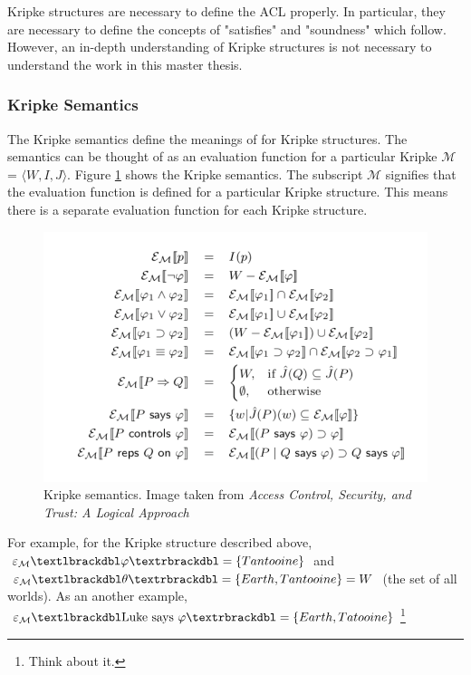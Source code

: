 \documentclass[../../main/main.tex]{subfiles}
\begin{document}
Kripke structures are necessary to define the ACL properly.  In particular, they are necessary to define the concepts of "satisfies" and "soundness" which follow.  However, an in-depth understanding of Kripke structures is not necessary to understand the work in this master thesis.  

\subsubsection{Kripke Semantics}\label{ssec:kripkesemantics}
The Kripke semantics define the meanings of  for Kripke structures.  The semantics can be thought of as an evaluation function for a particular Kripke $\mathcal{M}$ = $\langle \textit{W}, \textit{I}, \textit{J} \rangle $.  Figure \ref{kripkesemantics} shows the Kripke semantics.  The subscript $\mathcal{M}$ signifies that the evaluation function is defined for a particular Kripke structure.  This means there is a separate evaluation function for each Kripke structure.


\begin{figure}[h]
\centering
\includegraphics{../figures/kripkesemantics}
\caption{\label{kripkesemantics} Kripke semantics. Image taken from \textit{Access Control, Security, and Trust: A Logical Approach}\cite{ChinOlder}}
\end{figure}

For example, for the Kripke structure described above, $\varepsilon_{\mathcal{M}}\textlbrackdbl \varphi \textrbrackdbl  = \{Tantooine\}$ and $\varepsilon_{\mathcal{M}}\textlbrackdbl \theta \textrbrackdbl  = \{Earth, Tantooine\} = W$ (the set of all worlds).  As an another example, $\varepsilon_{\mathcal{M}}\textlbrackdbl \text{Luke says $\varphi$} \textrbrackdbl = \{Earth, Tatooine\}$\footnote{Think about it.  }
\end{document}
